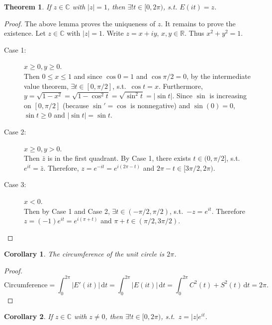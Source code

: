 \documentclass[12pt]{article}
\theoremstyle{plain}
\newtheorem{thm}{Theorem}
\newtheorem*{corollary}{Corollary}
\theoremstyle{definition}
\begin{document}
\begin{thm}
    If $z\in\mathbb{C}$ with $|z| = 1$, then $\exists! t\in[0,2\pi)$, s.t. $E(it) = z$.
\end{thm}
\begin{proof}
    The above lemma proves the uniqueness of $z$.
    It remains to prove the existence.
    Let $z\in\mathbb{C}$ with $|z|=1$.
    Write $z=x + iy$, $x, y\in\mathbb{R}$.
    Thus $x^2+y^2 = 1$.
    \begin{description}
        \item[Case 1:] $x\geq 0, y\geq 0$.\\
            Then $0\leq x\leq 1$ and since $\cos 0 = 1$ and $\cos \pi/2 = 0$, by the intermediate value theorem,
            $\exists t\in[0,\pi/2]$, s.t.\ $\cos t= x$.
            Furthermore, $y=\sqrt{1-x^2} = \sqrt{1-\cos^2 t} = \sqrt{\sin^2 t} = |\sin t|$.
            Since $\sin$ is increasing on $[0,\pi/2]$ (because $\sin' = \cos$ is nonnegative) and $\sin(0) = 0$, $\sin
            t\geq 0$ and $|\sin t| = \sin t$.
        \item[Case 2:] $x\geq 0, y>0$.\\
            Then $\bar{z}$ is in the first quadrant. By Case 1, there exists $t\in(0,\pi/2]$, s.t. $e^{it} = \bar{z}$.
            Therefore, $z = e^{-it} = e^{i(2\pi-t)}$ and $2\pi-t\in[3\pi/2, 2\pi)$.
        \item[Case 3:] $x < 0$.\\
            Then by Case 1 and Case 2, $\exists t\in(-\pi/2, \pi/2)$, s.t.\ $-z = e^{it}$.
            Therefore $z = (-1)e^{it} = e^{i(\pi + t)}$ and $\pi+t\in(\pi/2,3\pi/2)$.
    \end{description}
\end{proof}

\begin{corollary}
    The circumference of the unit circle is $2\pi$.
\end{corollary}
\begin{proof}
    \[\text{Circumference} = \int_0^{2\pi} |E'(it)|\,\mathrm{d}t = \int_0^{2\pi} |E(it)|\,\mathrm{d}t =
    \int_0^{2\pi}C^2(t) + S^2(t)\,\mathrm{d}t = 2\pi.\]
\end{proof}

\begin{corollary}
    If $z\in\mathbb{C}$ with $z\neq 0$, then $\exists! t\in[0,2\pi)$, s.t.\ $z=|z|e^{it}$.
\end{corollary}
\end{document}

